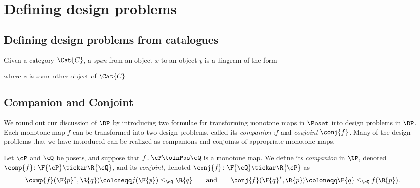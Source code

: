 \section{Defining design problems}
\subsection{Defining design problems from catalogues}
\begin{shaded}
\begin{definition}[Span]
Given a category $\Cat{C}$, a \emph{span} from an object $x$ to an object $y$ is a diagram of the form
\begin{center}
\end{center}
where $z$ is some other object of $\Cat{C}$. 
\end{definition}
\end{shaded}
\subsection{Companion and Conjoint}
We round out our discussion of $\DP$ by introducing two formulae for transforming monotone maps in $\Poset$ into design problems in $\DP$. Each monotone map $f$ can be transformed into two design problems, called its \emph{companion} $\comp{f}$ and \emph{conjoint} $\conj{f}$. Many of the design problems that we have introduced can be realized as companions and conjoints of appropriate monotone maps.

\begin{definition}
\label{def:comp_conj}
Let $\cP $ and $\cQ $ be posets, and suppose that $f\colon\cP \toinPos \cQ $ is a monotone map. We define its \emph{companion} in $\DP$, denoted $\comp{f}\colon \F{\cP} \tickar \R{\cQ}$,
and its \emph{conjoint}, denoted $\conj{f}\colon \F{\cQ} \tickar \R{\cP}$ as
\begin{equation}
\comp{f}(\F{p}^*,\R{q})\coloneqq f(\F{p}) \leq_\cQ \R{q}
\qquad\text{and}\qquad
\conj{f}(\F{q}^*,\R{p})\coloneqq \F{q} \leq_\cQ f(\R{p}).
\end{equation}
\end{definition}



